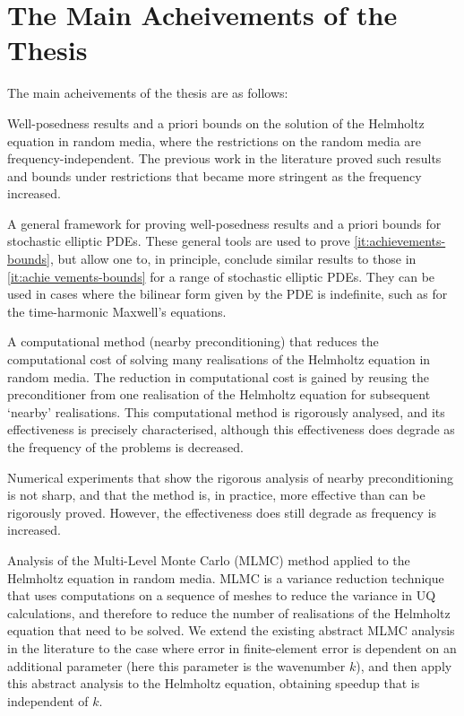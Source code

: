 \section{The Main Acheivements of the Thesis}

The main acheivements of the thesis are as follows:

\ben
\item\label{it:achievements-bounds} Well-posedness results and a priori bounds on the solution of the Helmholtz equation in random media, where the restrictions on the random media are frequency-independent. The previous work in the literature proved such results and bounds under restrictions that became more stringent as the frequency increased.

\item A general framework for proving well-posedness results and a priori bounds for stochastic elliptic PDEs. These general tools are used to prove \cref{it:achievements-bounds}, but allow one to, in principle, conclude similar results to those in \cref{it:achie 	vements-bounds} for a range of stochastic elliptic PDEs. They can be used in cases where the bilinear form given by the PDE is indefinite, such as for the time-harmonic Maxwell's equations.

\item A computational method (nearby preconditioning) that reduces the computational cost of solving many realisations of the Helmholtz equation in random media. The reduction in computational cost is gained by reusing the preconditioner from one realisation of the Helmholtz equation for subsequent `nearby' realisations. This computational method is rigorously analysed, and its effectiveness is precisely characterised, although this effectiveness does degrade as the frequency of the problems is decreased.

\item Numerical experiments that show the rigorous analysis of nearby preconditioning is not sharp, and that the method is, in practice, more effective than can be rigorously proved. However, the effectiveness does still degrade as frequency is increased.

\item Analysis of the Multi-Level Monte Carlo (MLMC) method applied to the Helmholtz equation in random media. MLMC is a variance reduction technique that uses computations on a sequence of meshes to reduce the variance in UQ calculations, and therefore to reduce the number of realisations of the Helmholtz equation that need to be solved. We extend the existing abstract MLMC analysis in the literature to the case where error in finite-element error is dependent on an additional parameter (here this parameter is the wavenumber $k$), and then apply this abstract analysis to the Helmholtz equation, obtaining speedup that is independent of $k$.

